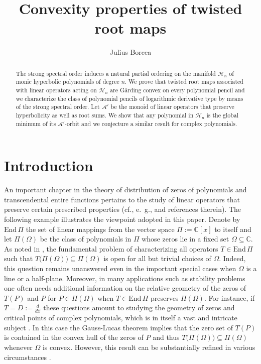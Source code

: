 \documentclass[10pt,twoside,a4paper,reqno]{amsart}
\theoremstyle{plain}
\theoremstyle{definition}
\theoremstyle{remark}
\newcommand {\bC} {\mathbb {C}}
\newcommand {\calH} {\mathcal {H}}
\newcommand {\calA} {\mathcal {A}}
\newcommand {\vP} {\varPi}
\newcommand {\E} {\text{End}\,}
\begin{document}
\title[Convexity properties of twisted root maps]{Convexity properties of 
twisted root maps}
\author[J.~Borcea]{Julius Borcea}
\address{Department of Mathematics, Stockholm University, SE-106 91 Stockholm,
   Sweden}

\begin{abstract}
The strong spectral order induces a natural partial ordering on the manifold 
$\calH_{n}$ of monic hyperbolic polynomials of degree $n$. We prove that 
twisted root maps associated with linear operators acting on $\calH_{n}$ are 
G\aa rding convex on every polynomial pencil and we characterize the class of 
polynomial pencils of logarithmic derivative type by means of the strong 
spectral order. Let ${\calA'}$ be the monoid of linear operators that preserve 
hyperbolicity as well as root sums. We show that any polynomial in 
$\calH_{n}$ is the global minimum of its ${\calA'}$-orbit and we 
conjecture a similar result for complex polynomials.
\end{abstract}

\maketitle

\section*{Introduction}

An important chapter in the theory of distribution of zeros of polynomials 
and transcendental entire functions pertains to the study of linear 
operators that preserve certain prescribed properties 
(cf., e.~g., \cite{CC1,L,RS} and references therein). The following example 
illustrates the viewpoint adopted in this paper. Denote by $\E\vP$ the set 
of linear mappings from the vector space $\vP:=\bC[x]$ to itself and let 
$\vP(\Omega)$ be 
the class of polynomials in $\vP$ whose zeros lie in a fixed set
$\Omega\subseteq \bC$. As noted in \cite{CC1}, the fundamental problem of 
characterizing all operators $T\in \E\vP$ such that 
$T\big(\vP(\Omega)\big)\subseteq \vP(\Omega)$ is open for all but 
trivial choices of $\Omega$. Indeed, this question remains unanswered even in 
the important special cases when $\Omega$ is a line or a half-plane. 
Moreover, in many applications such as stability problems one often 
needs additional information on 
the relative geometry of the zeros of $T(P)$ and $P$ for 
$P\in \vP(\Omega)$ when $T\in \E\vP$ preserves  
$\vP(\Omega)$. For instance, if 
$T=D:=\frac{d}{dx}$ these questions amount to studying the 
geometry of zeros and critical points of complex polynomials, which is 
in itself a vast and intricate subject \cite{RS}. In this case
the Gauss-Lucas theorem implies that the zero set of $T(P)$ is contained in 
the convex hull of the zeros of $P$ and thus 
$T\big(\vP(\Omega)\big)\subseteq \vP(\Omega)$ whenever $\Omega$ is convex. 
However, this result can be substantially refined in various circumstances 
\cite{O,RS}.
\end{document}
